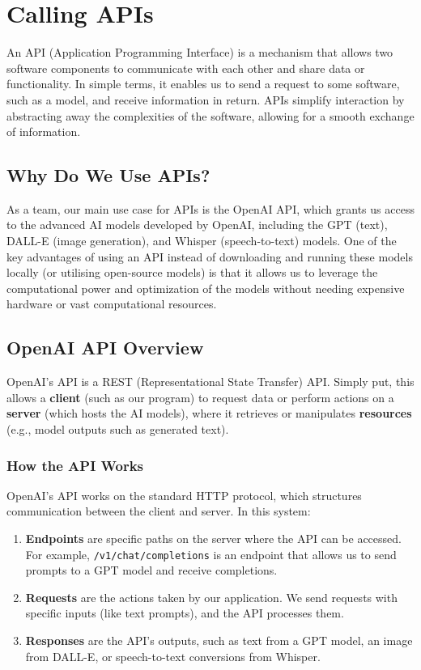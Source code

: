 \documentclass[
  letterpaper,
  DIV=11,
  numbers=noendperiod]{scrreprt}
\begin{document}
\chapter{Calling APIs}\label{calling-apis}

An API (Application Programming Interface) is a mechanism that allows
two software components to communicate with each other and share data or
functionality. In simple terms, it enables us to send a request to some
software, such as a model, and receive information in return. APIs
simplify interaction by abstracting away the complexities of the
software, allowing for a smooth exchange of information.

\section{Why Do We Use APIs?}\label{why-do-we-use-apis}

As a team, our main use case for APIs is the OpenAI API, which grants us
access to the advanced AI models developed by OpenAI, including the GPT
(text), DALL-E (image generation), and Whisper (speech-to-text) models.
One of the key advantages of using an API instead of downloading and
running these models locally (or utilising open-source models) is that
it allows us to leverage the computational power and optimization of the
models without needing expensive hardware or vast computational
resources.

\section{OpenAI API Overview}\label{openai-api-overview}

OpenAI's API is a REST (Representational State Transfer) API. Simply
put, this allows a \textbf{client} (such as our program) to request data
or perform actions on a \textbf{server} (which hosts the AI models),
where it retrieves or manipulates \textbf{resources} (e.g., model
outputs such as generated text).

\subsection{How the API Works}\label{how-the-api-works}

OpenAI's API works on the standard HTTP protocol, which structures
communication between the client and server. In this system:

\begin{enumerate}
\def\labelenumi{\arabic{enumi}.}
\item
  \textbf{Endpoints} are specific paths on the server where the API can
  be accessed. For example, \texttt{/v1/chat/completions} is an endpoint
  that allows us to send prompts to a GPT model and receive completions.
\item
  \textbf{Requests} are the actions taken by our application. We send
  requests with specific inputs (like text prompts), and the API
  processes them.
\item
  \textbf{Responses} are the API's outputs, such as text from a GPT
  model, an image from DALL-E, or speech-to-text conversions from
  Whisper.
\end{enumerate}
\end{document}
